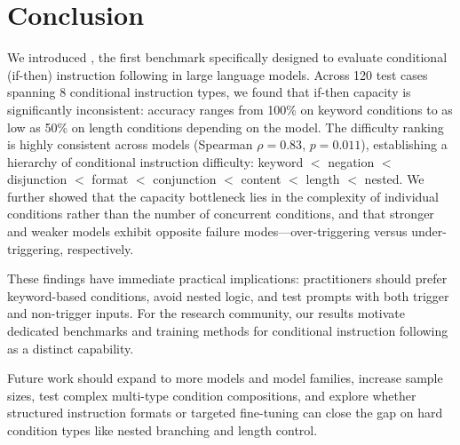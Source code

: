 \section{Conclusion}
\label{sec:conclusion}

We introduced \benchname, the first benchmark specifically designed to evaluate conditional (if-then) instruction following in large language models. Across 120 test cases spanning 8 conditional instruction types, we found that if-then capacity is significantly inconsistent: accuracy ranges from 100\% on keyword conditions to as low as 50\% on length conditions depending on the model. The difficulty ranking is highly consistent across models (Spearman $\rho = 0.83$, $p = 0.011$), establishing a hierarchy of conditional instruction difficulty: keyword $<$ negation $<$ disjunction $<$ format $<$ conjunction $<$ content $<$ length $<$ nested. We further showed that the capacity bottleneck lies in the complexity of individual conditions rather than the number of concurrent conditions, and that stronger and weaker models exhibit opposite failure modes---over-triggering versus under-triggering, respectively.

These findings have immediate practical implications: practitioners should prefer keyword-based conditions, avoid nested logic, and test prompts with both trigger and non-trigger inputs. For the research community, our results motivate dedicated benchmarks and training methods for conditional instruction following as a distinct capability.

Future work should expand \benchname to more models and model families, increase sample sizes, test complex multi-type condition compositions, and explore whether structured instruction formats or targeted fine-tuning can close the gap on hard condition types like nested branching and length control.
